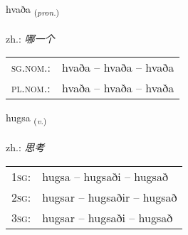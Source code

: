 \documentclass[frontgrid, backgrid]{flacards}\usepackage[]{graphicx}\usepackage[]{xcolor}
\begin{document}
{hvaða \small{\textsubscript{(\textit{pron.})}} \\[1ex] %
\textphonetic{[kʰvaːða]} \\
zh.: \emph{哪一个} \\  [2ex]
\renewcommand*{\arraystretch}{0.8}
\begin{tabular}{ll}
\textsc{sg.nom.}: & hvaða  --  hvaða -- hvaða \\ 
\textsc{pl.nom.}: & hvaða -- hvaða -- hvaða
\end{tabular}
}

\renewcommand{\flhead}{\vskip5pt \fboxsep=0pt {\small\bfseries\footnotesize Sagnorð | 动词}}
\renewcommand{\fcfoot}{\vskip5pt \fboxsep=0pt \hspace{2pt}{\small\bfseries\footnotesize 1K}}

\renewcommand{\blhead}{\vskip5pt {\small\bfseries\footnotesize Sagnorð | 动词 }}
\renewcommand{\bcfoot}{\vskip5pt \hspace{2pt}{\small\bfseries\footnotesize 1K}}


{hugsa \small{\textsubscript{(\textit{v.})}} \\[1ex] %
\textphonetic{[hʏksa]} \\
zh.: \emph{思考} \\  [2ex]
\renewcommand*{\arraystretch}{0.8}
\begin{tabular}{p{1cm}l}
\textsc{1sg}: & hugsa -- hugsaði -- hugsað \\ 
\textsc{2sg}: & hugsar -- hugsaðir -- hugsað \\ 
\textsc{3sg}: & hugsar -- hugsaði -- hugsað \\ 
\end{tabular}
}

\renewcommand{\flhead}{\vskip5pt \fboxsep=0pt {\small\bfseries\footnotesize Sagnorð | 动词}}
\renewcommand{\fcfoot}{\vskip5pt \fboxsep=0pt \hspace{2pt}{\small\bfseries\footnotesize 1K}}

\renewcommand{\blhead}{\vskip5pt {\small\bfseries\footnotesize Sagnorð | 动词 }}
\renewcommand{\bcfoot}{\vskip5pt \hspace{2pt}{\small\bfseries\footnotesize 1K}}
\end{document}
